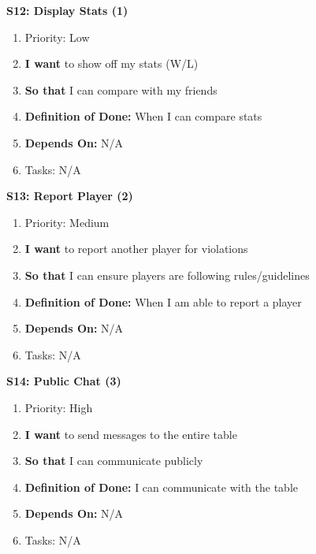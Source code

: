 \textbf{S12: Display Stats (1)}
\begin{enumerate}
    \item Priority: Low
    \item \textbf{I want} to show off my stats (W/L)
    \item \textbf{So that} I can compare with my friends
    \item \textbf{Definition of Done:} When I can compare stats
    \item \textbf{Depends On:} N/A
    \item Tasks: N/A
\end{enumerate}


\textbf{S13: Report Player (2)}
\begin{enumerate}
    \item Priority: Medium
    \item \textbf{I want} to report another player for violations
    \item \textbf{So that} I can ensure players are following rules/guidelines
    \item \textbf{Definition of Done:} When I am able to report a player
    \item \textbf{Depends On:} N/A
    \item Tasks: N/A
\end{enumerate}


\textbf{S14: Public Chat (3)}
\begin{enumerate}
    \item Priority: High
    \item \textbf{I want} to send messages to the entire table
    \item \textbf{So that} I can communicate publicly
    \item \textbf{Definition of Done:} I can communicate with the table
    \item \textbf{Depends On:} N/A
    \item Tasks: N/A
\end{enumerate}


